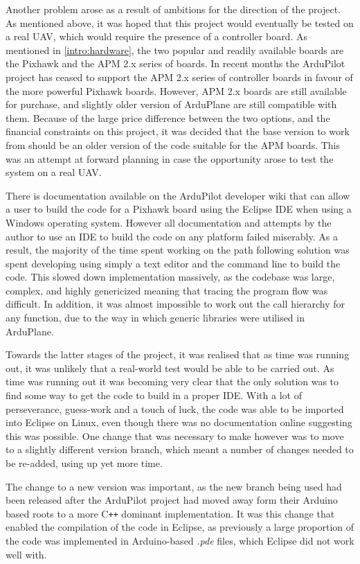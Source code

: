 Another problem arose as a result of ambitions for the direction of the project. As mentioned above, it was hoped that this project would eventually be tested on a real UAV, which would require the presence of a controller board. As mentioned in \ref{intro:hardware}, the two popular and readily available boards are the Pixhawk and the APM 2.x series of boards. In recent months the ArduPilot project has ceased to support the APM 2.x series of controller boards in favour of the more powerful Pixhawk boards. However, APM 2.x boards are still available for purchase, and slightly older version of ArduPlane are still compatible with them. Because of the large price difference between the two options, and the financial constraints on this project, it was decided that the base version to work from should be an older version of the code suitable for the APM boards. This was an attempt at forward planning in case the opportunity arose to test the system on a real UAV. 

There is documentation available on the ArduPilot developer wiki that can allow a user to build the code for a Pixhawk board using the Eclipse IDE when using a Windows operating system. However all documentation and attempts by the author to use an IDE to build the code on any platform failed miserably. As a result, the majority of the time spent working on the path following solution was spent developing using simply a text editor and the command line to build the code. This slowed down implementation massively, as the codebase was large, complex, and highly genericized meaning that tracing the program flow was difficult. In addition, it was almost impossible to work out the call hierarchy for any function, due to the way in which generic libraries were utilised in ArduPlane.

Towards the latter stages of the project, it was realised that as time was running out, it was unlikely that a real-world test would be able to be carried out. As time was running out it was becoming very clear that the only solution was to find some way to get the code to build in a proper IDE. With a lot of perseverance, guess-work and a touch of luck, the code was able to be imported into Eclipse on Linux, even though there was no documentation online suggesting this was possible. One change that was necessary to make however was to move to a slightly different version branch, which meant a number of changes needed to be re-added, using up yet more time. 

The change to a new version was important, as the new branch being used had been released after the ArduPilot project had moved away form their Arduino based roots to a more C\texttt{++} dominant implementation. It was this change that enabled the compilation of the code in Eclipse, as previously a large proportion of the code was implemented in Arduino-based \textit{.pde} files, which Eclipse did not work well with.


